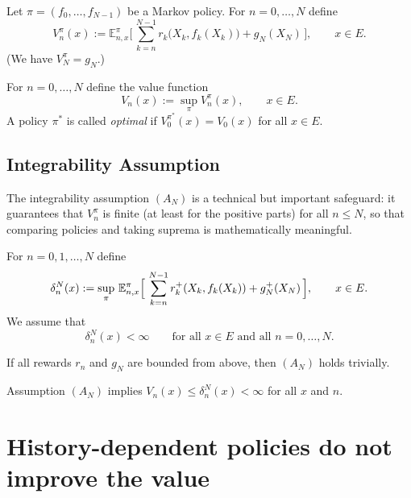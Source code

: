 \begin{definition}
Let $\pi=(f_0,\dots,f_{N-1})$ be a Markov policy. For $n=0,\dots,N$ define
\[
V_n^{\pi}(x) := \mathbb{E}_{n,x}^{\pi}\Big[\,\sum_{k=n}^{N-1} r_k\big(X_k,f_k(X_k)\big) + g_N(X_N)\,\Big],\qquad x\in E.
\]
(We have $V_N^{\pi}=g_N$.)
\end{definition}

\begin{definition}
For $n=0,\dots,N$ define the value function
\[
V_n(x) := \sup_{\pi} V_n^{\pi}(x),\qquad x\in E.
\]
A policy $\pi^*$ is called \emph{optimal} if $V_0^{\pi^*}(x)=V_0(x)$ for all $x\in E$.
\end{definition}

\subsection{Integrability Assumption}
The integrability assumption $(A_N)$ is a technical but important safeguard: it guarantees that $V_n^{\pi}$ is finite (at least for the positive parts) for all $n \leq N$, so that comparing policies and taking suprema is mathematically meaningful.

\begin{definition}
For $n=0,1,\dots,N$ define
\[
\delta_n^N(x) := \sup_{\pi}\, \mathbb{E}_{n,x}^{\pi}\Big[\,\sum_{k=n}^{N-1} r_k^{+}(X_k,f_k(X_k)) + g_N^{+}(X_N)\,\Big],\qquad x\in E.
\]
We assume that
\[
\delta_n^N(x)<\infty\qquad \text{for all }x\in E\text{ and all }n=0,\dots,N.
\]
\end{definition}

\begin{remark}
If all rewards $r_n$ and $g_N$ are bounded from above, then $(A_N)$ holds trivially.
\end{remark}
\begin{remark}
Assumption $(A_N)$ implies $V_n(x)\le \delta_n^N(x)<\infty$ for all $x$ and $n$.
\end{remark}

\section{History-dependent policies do not improve the value}

